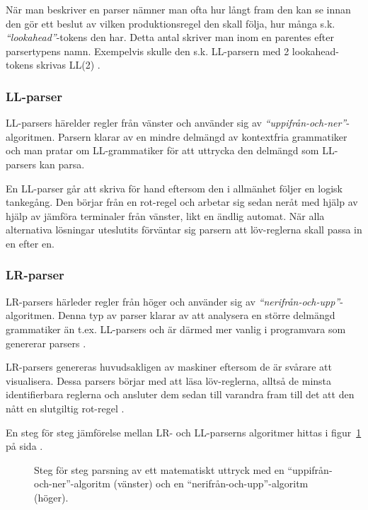 När man beskriver en parser nämner man ofta hur långt fram den kan se innan
den gör ett beslut av vilken produktionsregel den skall följa, hur många s.k.
\textit{``lookahead''}-tokens den har. Detta antal skriver man inom en
parentes efter parsertypens namn. Exempelvis skulle den s.k. LL-parsern med 2
lookahead-tokens skrivas LL(2) \citep[s. 69]{sm09}.

\subsubsection{LL-parser}

LL-parsers härelder regler från vänster och använder sig av
\textit{``uppifrån-och-ner''}-algoritmen. Parsern klarar av en mindre delmängd
av kontextfria grammatiker och man pratar om LL-grammatiker för att uttrycka
den delmängd som LL-parsers kan parsa.

En LL-parser går att skriva för hand eftersom den i allmänhet följer en logisk
tankegång. Den börjar från en rot-regel och arbetar sig sedan neråt
med hjälp av hjälp av jämföra terminaler från vänster, likt en ändlig
automat. När alla alternativa lösningar uteslutits förväntar sig parsern att
löv-reglerna skall passa in en efter en.

\subsubsection{LR-parser}

LR-parsers härleder regler från höger och använder sig av
\textit{``nerifrån-och-upp''}-algoritmen. Denna typ av parser klarar av att
analysera en större delmängd grammatiker än t.ex. LL-parsers och är därmed mer
vanlig i programvara som genererar parsers \citep[s. 61]{aa06}.

LR-parsers genereras huvudsakligen av maskiner eftersom de är svårare att
visualisera. Dessa parsers börjar med att läsa löv-reglerna, alltså de minsta
identifierbara reglerna och ansluter dem sedan till varandra fram till det att
den nått en slutgiltig rot-regel \citep[s. 67]{sm09}.

En steg för steg jämförelse mellan LR- och LL-parserns algoritmer hittas i
figur~\ref{fig:ll-vs-lr} på sida \pageref{fig:ll-vs-lr}.

\begin{figure}[ht]
  \begin{minipage}[t]{0.5\textwidth}
    
  \end{minipage}%
  \begin{minipage}[t]{0.5\textwidth}
    
  \end{minipage}%
  \caption{Steg för steg parsning av ett matematiskt uttryck med en
    ``uppifrån-och-ner''-algoritm (vänster) och en
    ``nerifrån-och-upp''-algoritm (höger).}
  \label{fig:ll-vs-lr}
\end{figure}

